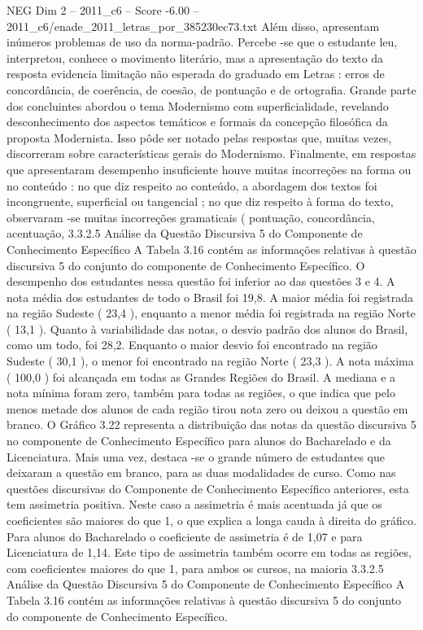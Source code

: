 \begin{textsample}{NEG Dim 2 – 2011\_c6 – Score -6.00 – 2011\_c6/enade\_2011\_letras\_por\_385230ec73.txt}
Além disso, apresentam inúmeros problemas de uso da norma-padrão.
Percebe -se que o estudante leu, interpretou, conhece o movimento literário, mas a apresentação do texto da resposta evidencia limitação não esperada do graduado em Letras : erros de concordância, de coerência, de coesão, de pontuação e de ortografia.
Grande parte dos concluintes abordou o tema Modernismo com superficialidade, revelando desconhecimento dos aspectos temáticos e formais da concepção filosófica da proposta Modernista.
Isso pôde ser notado pelas respostas que, muitas vezes, discorreram sobre características gerais do Modernismo.
Finalmente, em respostas que apresentaram desempenho insuficiente houve muitas incorreções na forma ou no conteúdo : no que diz respeito ao conteúdo, a abordagem dos textos foi incongruente, superficial ou tangencial ; no que diz respeito à forma do texto, observaram -se muitas incorreções gramaticais ( pontuação, concordância, acentuação, 3.3.2.5 Análise da Questão Discursiva 5 do Componente de Conhecimento Específico A Tabela 3.16 contém as informações relativas à questão discursiva 5 do conjunto do componente de Conhecimento Específico.
O desempenho dos estudantes nessa questão foi inferior ao das questões 3 e 4.
A nota média dos estudantes de todo o Brasil foi 19,8.
A maior média foi registrada na região Sudeste ( 23,4 ), enquanto a menor média foi registrada na região Norte ( 13,1 ).
Quanto à variabilidade das notas, o desvio padrão dos alunos do Brasil, como um todo, foi 28,2.
Enquanto o maior desvio foi encontrado na região Sudeste ( 30,1 ), o menor foi encontrado na região Norte ( 23,3 ).
A nota máxima ( 100,0 ) foi alcançada em todas as Grandes Regiões do Brasil.
A mediana e a nota mínima foram zero, também para todas as regiões, o que indica que pelo menos metade dos alunos de cada região tirou nota zero ou deixou a questão em branco.
O Gráfico 3.22 representa a distribuição das notas da questão discursiva 5 no componente de Conhecimento Específico para alunos do Bacharelado e da Licenciatura.
Mais uma vez, destaca -se o grande número de estudantes que deixaram a questão em branco, para as duas modalidades de curso.
Como nas questões discursivas do Componente de Conhecimento Específico anteriores, esta tem assimetria positiva.
Neste caso a assimetria é mais acentuada já que os coeficientes são maiores do que 1, o que explica a longa cauda à direita do gráfico.
Para alunos do Bacharelado o coeficiente de assimetria é de 1,07 e para Licenciatura de 1,14.
Este tipo de assimetria também ocorre em todas as regiões, com coeficientes maiores do que 1, para ambos os cursos, na maioria 3.3.2.5 Análise da Questão Discursiva 5 do Componente de Conhecimento Específico A Tabela 3.16 contém as informações relativas à questão discursiva 5 do conjunto do componente de Conhecimento Específico.

\end{textsample}
